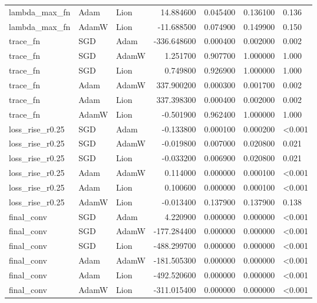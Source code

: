 \begin{tabular}{lllrrrl}
lambda\_max\_fn & Adam & Lion & 14.884600 & 0.045400 & 0.136100 & 0.136 \\
lambda\_max\_fn & AdamW & Lion & -11.688500 & 0.074900 & 0.149900 & 0.150 \\
trace\_fn & SGD & Adam & -336.648600 & 0.000400 & 0.002000 & 0.002 \\
trace\_fn & SGD & AdamW & 1.251700 & 0.907700 & 1.000000 & 1.000 \\
trace\_fn & SGD & Lion & 0.749800 & 0.926900 & 1.000000 & 1.000 \\
trace\_fn & Adam & AdamW & 337.900200 & 0.000300 & 0.001700 & 0.002 \\
trace\_fn & Adam & Lion & 337.398300 & 0.000400 & 0.002000 & 0.002 \\
trace\_fn & AdamW & Lion & -0.501900 & 0.962400 & 1.000000 & 1.000 \\
loss\_rise\_r0.25 & SGD & Adam & -0.133800 & 0.000100 & 0.000200 & <0.001 \\
loss\_rise\_r0.25 & SGD & AdamW & -0.019800 & 0.007000 & 0.020800 & 0.021 \\
loss\_rise\_r0.25 & SGD & Lion & -0.033200 & 0.006900 & 0.020800 & 0.021 \\
loss\_rise\_r0.25 & Adam & AdamW & 0.114000 & 0.000000 & 0.000100 & <0.001 \\
loss\_rise\_r0.25 & Adam & Lion & 0.100600 & 0.000000 & 0.000100 & <0.001 \\
loss\_rise\_r0.25 & AdamW & Lion & -0.013400 & 0.137900 & 0.137900 & 0.138 \\
final\_conv & SGD & Adam & 4.220900 & 0.000000 & 0.000000 & <0.001 \\
final\_conv & SGD & AdamW & -177.284400 & 0.000000 & 0.000000 & <0.001 \\
final\_conv & SGD & Lion & -488.299700 & 0.000000 & 0.000000 & <0.001 \\
final\_conv & Adam & AdamW & -181.505300 & 0.000000 & 0.000000 & <0.001 \\
final\_conv & Adam & Lion & -492.520600 & 0.000000 & 0.000000 & <0.001 \\
final\_conv & AdamW & Lion & -311.015400 & 0.000000 & 0.000000 & <0.001 \\
\bottomrule
\end{tabular}
